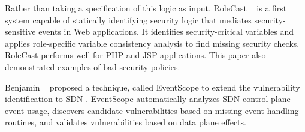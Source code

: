 Rather than taking a specification of this logic as input, RoleCast
\etal~\cite{10.1145/2048066.2048146} is a first system capable of statically
identifying security logic that mediates security-sensitive events in Web
applications. It identifies security-critical variables and applies
role-specific variable consistency analysis to find missing security checks.
RoleCast performs well for PHP and JSP applications. This paper also
demonstrated examples of bad security policies.

Benjamin \etal~\cite{inproceedings} proposed a technique, called EventScope to
extend the vulnerability identification to SDN \cite{6994333}. EventScope
automatically analyzes SDN control plane event usage, discovers candidate
vulnerabilities based on missing event-handling routines, and validates
vulnerabilities based on data plane effects.

